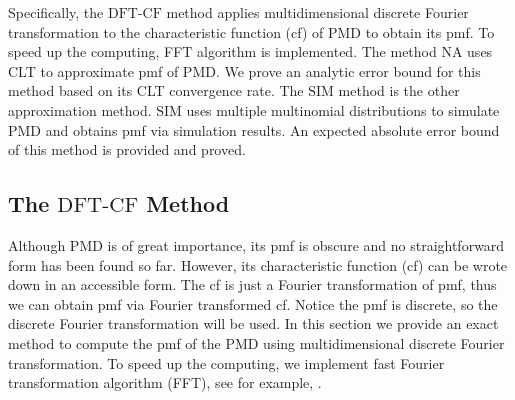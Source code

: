 \documentclass[12pt]{article}
\newcommand{\PMD}{\textrm{PMD}}
\newcommand{\SIM}{{\textrm{SIM}}}
\newcommand{\NA}{{\textrm{NA}}}
\newcommand{\dft}{{\textrm{DFT-CF}}}
\begin{document}
Specifically, the $\dft$ method applies multidimensional discrete Fourier transformation to the characteristic function (cf) of $\PMD$ to obtain its pmf. To speed up the computing, FFT algorithm is implemented. The method $\NA$ uses CLT to approximate pmf of $\PMD$. We prove an analytic error bound for this method based on its CLT convergence rate. The $\SIM$ method is the other approximation method. $\SIM$ uses multiple multinomial distributions to simulate $\PMD$ and obtains pmf via simulation results. An expected absolute error bound of this method is provided and proved.

\subsection{The $\dft$ Method}
Although $\PMD$ is of great importance, its pmf is obscure and no straightforward form has been found so far. However, its characteristic function (cf) can be wrote down in an accessible form. The cf is just a Fourier transformation of pmf, thus we can obtain pmf via Fourier transformed cf. Notice the pmf is discrete, so the discrete Fourier transformation will be used. In this section we provide an exact method to compute the pmf of the PMD using multidimensional discrete Fourier transformation. To speed up the computing, we implement fast Fourier transformation algorithm (FFT), see for example, .
\end{document}

